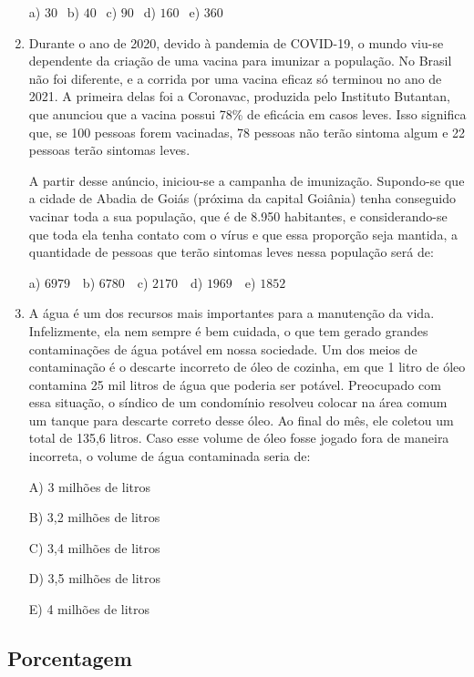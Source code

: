 \begin{multicols*}{2}
\begin{enumerate}
              a) $30 \ \ $ b) $40 \ \ $ c) $90 \ \ $ d) $160 \ \ $ e) $360 \ \ $

        \item Durante o ano de 2020, devido à pandemia de COVID-19, o mundo viu-se dependente da criação de uma vacina para imunizar a população. No Brasil não foi diferente, e a corrida por uma vacina eficaz só terminou no ano de 2021. A primeira delas foi a Coronavac, produzida pelo Instituto Butantan, que anunciou que a vacina possui 78\% de eficácia em casos leves. Isso significa que, se 100 pessoas forem vacinadas, 78 pessoas não terão sintoma algum e 22 pessoas terão sintomas leves.

              A partir desse anúncio, iniciou-se a campanha de imunização. Supondo-se que a cidade de Abadia de Goiás (próxima da capital Goiânia) tenha conseguido vacinar toda a sua população, que é de 8.950 habitantes, e considerando-se que toda ela tenha contato com o vírus e que essa proporção seja mantida, a quantidade de pessoas que terão sintomas leves nessa população será de:

              a) $6979 \ \ \ $ b) $6780 \ \ \ $ c) $2170 \ \ \ $ d) $1969 \ \ \ $ e) $1852 \ \ $

        \item A água é um dos recursos mais importantes para a manutenção da vida. Infelizmente, ela nem sempre é bem cuidada, o que tem gerado grandes contaminações de água potável em nossa sociedade. Um dos meios de contaminação é o descarte incorreto de óleo de cozinha, em que 1 litro de óleo contamina 25 mil litros de água que poderia ser potável. Preocupado com essa situação, o síndico de um condomínio resolveu colocar na área comum um tanque para descarte correto desse  óleo. Ao final do mês, ele coletou um total de 135,6 litros. Caso esse volume de óleo fosse jogado fora de maneira incorreta, o volume de água contaminada seria de:

              A) 3 milhões de litros

              B) 3,2 milhões de litros

              C) 3,4 milhões de litros

              D) 3,5 milhões de litros

              E) 4 milhões de litros

    \end{enumerate}

    \subsection*{Porcentagem}


\end{multicols*}

